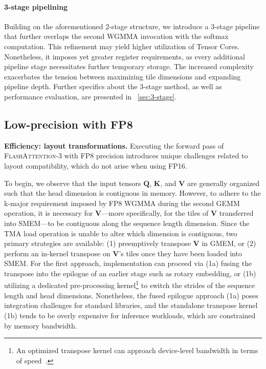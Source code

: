 \begin{algorithm}[H]
\begin{algorithmic}[1]
\paragraph{3-stage pipelining} Building on the aforementioned 2-stage structure, we introduce a 3-stage pipeline that further overlaps the second WGMMA invocation with the softmax computation. This refinement may yield higher utilization of Tensor Cores. Nonetheless, it imposes yet greater register requirements, as every additional pipeline stage necessitates further temporary storage. The increased complexity exacerbates the tension between maximizing tile dimensions and expanding pipeline depth. Further specifics about the 3-stage method, as well as performance evaluation, are presented in ~\cref{sec:3-stage}.

\subsection{Low-precision with FP8}
\label{sec:algofp8}

\textbf{Efficiency: layout transformations.} Executing the forward pass of \textsc{FlashAttention-3} with FP8 precision introduces unique challenges related to layout compatibility, which do not arise when using FP16.

To begin, we observe that the input tensors $\mathbf{Q}$, $\mathbf{K}$, and $\mathbf{V}$ are generally organized such that the head dimension is contiguous in memory. However, to adhere to the k-major requirement imposed by FP8 WGMMA during the second GEMM operation, it is necessary for $\mathbf{V}$—more specifically, for the tiles of $\mathbf{V}$ transferred into SMEM—to be contiguous along the sequence length dimension. Since the TMA load operation is unable to alter which dimension is contiguous, two primary strategies are available: (1) preemptively transpose $\mathbf{V}$ in GMEM, or (2) perform an in-kernel transpose on $\mathbf{V}$'s tiles once they have been loaded into SMEM. For the first approach, implementation can proceed via (1a) fusing the transpose into the epilogue of an earlier stage such as rotary embedding, or (1b) utilizing a dedicated pre-processing kernel\footnote{An optimized transpose kernel can approach device-level bandwidth in terms of speed~\citep{colfax_cutlass_transpose_2024}.} to switch the strides of the sequence length and head dimensions. Nonetheless, the fused epilogue approach (1a) poses integration challenges for standard libraries, and the standalone transpose kernel (1b) tends to be overly expensive for inference workloads, which are constrained by memory bandwidth.


\end{algorithmic}
\end{algorithm}
